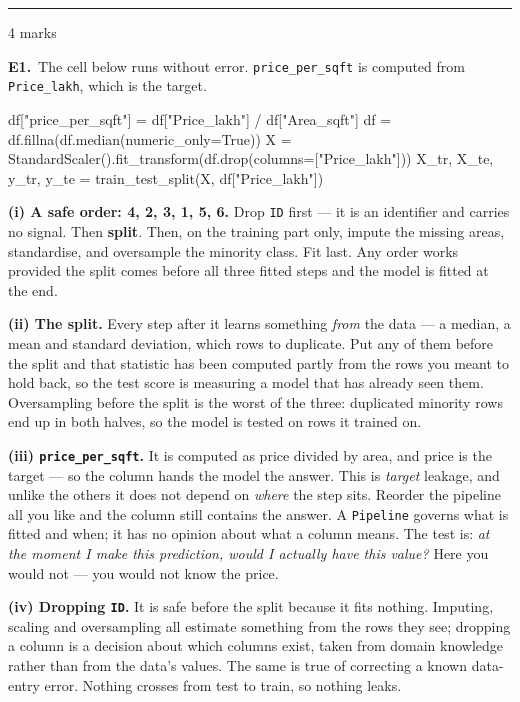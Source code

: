 \documentclass[10pt,a4paper]{article}
\newcommand{\parthead}[2]{\vspace{2pt}\noindent\rule{\linewidth}{0.4pt}\par\vspace{2pt}%
  \noindent{\bfseries Part #1}\hfill{\small #2}\par\vspace{1pt}}
\begin{document}
\newpage

\parthead{E --- Reasoning}{4 marks}

\textbf{E1.}\ The cell below runs without error. \texttt{price\_per\_sqft} is computed from \texttt{Price\_lakh},
which is the target.

\begin{code}
df["price_per_sqft"] = df["Price_lakh"] / df["Area_sqft"]
df = df.fillna(df.median(numeric_only=True))
X = StandardScaler().fit_transform(df.drop(columns=["Price_lakh"]))
X_tr, X_te, y_tr, y_te = train_test_split(X, df["Price_lakh"])
\end{code}

\vspace{4pt}

\textbf{(i) A safe order: 4, 2, 3, 1, 5, 6.} Drop \texttt{ID} first --- it is an identifier and carries no signal. Then \textbf{split}. Then, on the training part only, impute the missing areas, standardise, and oversample the minority class. Fit last. Any order works provided the split comes before all three fitted steps and the model is fitted at the end.\par\vspace{1mm}\textbf{(ii) The split.} Every step after it learns something \emph{from} the data --- a median, a mean and standard deviation, which rows to duplicate. Put any of them before the split and that statistic has been computed partly from the rows you meant to hold back, so the test score is measuring a model that has already seen them. Oversampling before the split is the worst of the three: duplicated minority rows end up in both halves, so the model is tested on rows it trained on.\par\vspace{1mm}\textbf{(iii) \texttt{price\_per\_sqft}.} It is computed as price divided by area, and price is the target --- so the column hands the model the answer. This is \emph{target} leakage, and unlike the others it does not depend on \emph{where} the step sits. Reorder the pipeline all you like and the column still contains the answer. A \texttt{Pipeline} governs what is fitted and when; it has no opinion about what a column means. The test is: \emph{at the moment I make this prediction, would I actually have this value?} Here you would not --- you would not know the price.\par\vspace{1mm}\textbf{(iv) Dropping \texttt{ID}.} It is safe before the split because it fits nothing. Imputing, scaling and oversampling all estimate something from the rows they see; dropping a column is a decision about which columns exist, taken from domain knowledge rather than from the data's values. The same is true of correcting a known data-entry error. Nothing crosses from test to train, so nothing leaks.
\end{document}
